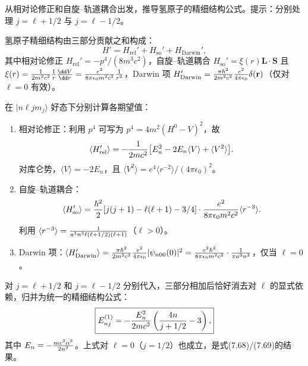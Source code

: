 \begin{question}
从相对论修正和自旋--轨道耦合出发，推导氢原子的精细结构公式。提示：分别处理 $j=\ell+1/2$ 与 $j=\ell-1/2$。
\end{question}
\begin{solution}
氢原子精细结构由三部分贡献之和构成：
\[
H' = H_{\text{rel}}' + H_{\text{so}}' + H_{\text{Darwin}}',
\]
其中相对论修正 $H_{\text{rel}}'=-p^4/(8m^3c^2)$，自旋--轨道耦合 $H_{\text{so}}'=\xi(r)\mathbf L\cdot\mathbf S$ 且 $\xi(r)={1\over2m^2c^2}{1\over r}{\dd V\over\dd r}={e^2\over8\pi\epsilon_0 m^2c^2}{1\over r^3}$，Darwin 项 $H_{\text{Darwin}}'={\pi\hbar^2\over2m^2c^2}{e^2\over4\pi\epsilon_0}\delta(\mathbf r)$（仅对 $\ell=0$ 有效）。

在 $|n\ell j m_j\rangle$ 好态下分别计算各期望值：
\begin{enumerate}
\item 相对论修正：利用 $p^4$ 可写为 $p^4=4m^2(H^0-V)^2$，故
\[
\langle H_{\text{rel}}'\rangle=-{1\over2mc^2}\bigl[E_n^2-2E_n\langle V\rangle+\langle V^2\rangle\bigr].
\]
对库仑势，$\langle V\rangle=-2E_n$，且 $\langle V^2\rangle=e^4\langle r^{-2}\rangle/(4\pi\epsilon_0)^2$。
\item 自旋--轨道耦合：
\[
\langle H_{\text{so}}'\rangle = {\hbar^2\over2}[j(j+1)-\ell(\ell+1)-3/4]\cdot{e^2\over8\pi\epsilon_0 m^2c^2}\langle r^{-3}\rangle.
\]
利用 $\langle r^{-3}\rangle={1\over a^3 n^3\ell(\ell+1/2)(\ell+1)}$（$\ell>0$）。
\item Darwin 项：$\langle H_{\text{Darwin}}'\rangle = {\pi\hbar^2\over2m^2c^2}{e^2\over4\pi\epsilon_0}|\psi_{n00}(0)|^2 = {e^2\hbar^2\over8\pi\epsilon_0 m^2c^2}\cdot{1\over\pi a^3 n^3}$，仅当 $\ell=0$。
\end{enumerate}

对 $j=\ell+1/2$ 和 $j=\ell-1/2$ 分别代入，三部分相加后恰好消去对 $\ell$ 的显式依赖，归并为统一的精细结构公式：
\[
\boxed{E_{nj}^{(1)}=-{E_n^2\over2mc^2}\left({4n\over j+1/2}-3\right),}
\]
其中 $E_n=-{mc^2\alpha^2\over2n^2}$。上式对 $\ell=0$（$j=1/2$）也成立，是式(7.68)/(7.69)的结果。
\end{solution}

